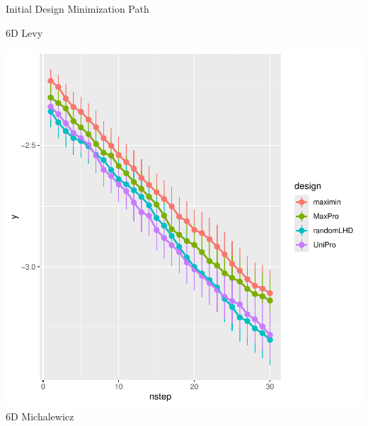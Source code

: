 \documentclass{beamer}
\begin{document}
\begin{frame}{Initial Design Minimization Path}
\begin{minipage}{0.32\textwidth}
\small {6D Levy}
\end{minipage}
\hfill
\begin{minipage}{0.32\textwidth}
\centering
\includegraphics[width=\textwidth]{../chapters/EGO/pdfs/michal6_lineplot1}
\small{6D Michalewicz}
\end{minipage}
\end{frame}
\end{document}

